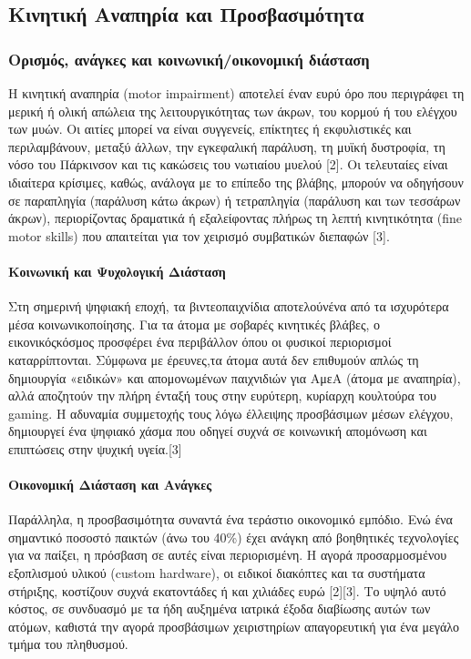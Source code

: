 \documentclass[twoside, a4paper, 11pt]{article}
\begin{document}
\subsection{Κινητική Αναπηρία και Προσβασιμότητα}

\subsubsection{Ορισμός, ανάγκες και κοινωνική/οικονομική διάσταση}
Η κινητική αναπηρία (motor impairment) αποτελεί έναν ευρύ όρο που περιγράφει τη μερική ή ολική απώλεια της λειτουργικότητας των άκρων, του κορμού ή του ελέγχου των μυών. Οι αιτίες μπορεί να είναι συγγενείς, επίκτητες ή εκφυλιστικές και περιλαμβάνουν, μεταξύ άλλων, την εγκεφαλική παράλυση, τη μυϊκή δυστροφία, τη νόσο του Πάρκινσον και τις κακώσεις του νωτιαίου μυελού [2]. Οι τελευταίες είναι ιδιαίτερα κρίσιμες, καθώς, ανάλογα με το επίπεδο της βλάβης, μπορούν να οδηγήσουν σε παραπληγία (παράλυση κάτω άκρων) ή τετραπληγία (παράλυση και των τεσσάρων άκρων), περιορίζοντας δραματικά ή εξαλείφοντας πλήρως τη λεπτή κινητικότητα (fine motor skills) που απαιτείται για τον χειρισμό συμβατικών διεπαφών [3].

\paragraph{Κοινωνική και Ψυχολογική Διάσταση}
Στη σημερινή ψηφιακή εποχή, τα βιντεοπαιχνίδια αποτελούνένα από τα ισχυρότερα μέσα κοινωνικοποίησης. Για τα άτομα με σοβαρές κινητικές βλάβες, ο εικονικόςκόσμος προσφέρει ένα περιβάλλον όπου οι φυσικοί περιορισμοί καταρρίπτονται. Σύμφωνα με έρευνες,τα άτομα αυτά δεν επιθυμούν απλώς τη δημιουργία «ειδικών» και απομονωμένων παιχνιδιών για ΑμεΑ (άτομα με αναπηρία), αλλά αποζητούν την πλήρη ένταξή τους στην ευρύτερη, κυρίαρχη κουλτούρα του gaming. Η αδυναμία συμμετοχής τους λόγω έλλειψης προσβάσιμων μέσων ελέγχου, δημιουργεί ένα ψηφιακό χάσμα που οδηγεί συχνά σε κοινωνική απομόνωση και επιπτώσεις στην ψυχική υγεία.[3]
\paragraph{Οικονομική Διάσταση και Ανάγκες}
Παράλληλα, η προσβασιμότητα συναντά ένα τεράστιο οικονομικό εμπόδιο. Ενώ ένα σημαντικό ποσοστό παικτών (άνω του 40\%) έχει ανάγκη από βοηθητικές τεχνολογίες για να παίξει, η πρόσβαση σε αυτές είναι περιορισμένη. Η αγορά προσαρμοσμένου εξοπλισμού υλικού (custom hardware), οι ειδικοί διακόπτες και τα συστήματα στήριξης, κοστίζουν συχνά εκατοντάδες ή και χιλιάδες ευρώ [2][3]. Το υψηλό αυτό κόστος, σε συνδυασμό με τα ήδη αυξημένα ιατρικά έξοδα διαβίωσης αυτών των ατόμων, καθιστά την αγορά προσβάσιμων χειριστηρίων απαγορευτική για ένα μεγάλο τμήμα του πληθυσμού.
\end{document}
